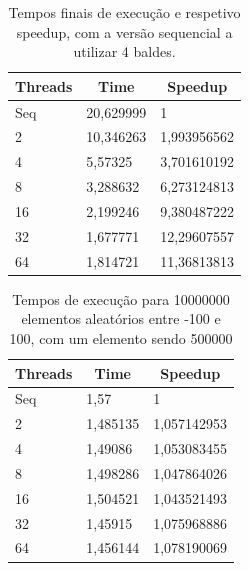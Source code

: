 \documentclass[a4paper]{report}
\begin{document}
\begin{table}[h]
    \centering
    \begin{tabular}{|l|l|l|}
        \hline
        \multicolumn{1}{|c|}{Threads} & \multicolumn{1}{c|}{Time} & \multicolumn{1}{c|}{Speedup} \\ \hline
        Seq                           & 20,629999                 & 1                            \\ \hline
        2                             & 10,346263                 & 1,993956562                  \\ \hline
        4                             & 5,57325                   & 3,701610192                  \\ \hline
        8                             & 3,288632                  & 6,273124813                  \\ \hline
        16                            & 2,199246                  & 9,380487222                  \\ \hline
        32                            & 1,677771                  & 12,29607557                  \\ \hline
        64                            & 1,814721                  & 11,36813813                  \\ \hline
    \end{tabular}
    \caption{\label{tab:final}Tempos finais de execução e respetivo speedup, com a
    versão sequencial a utilizar 4 baldes.}
\end{table}

\begin{table}[h]
    \centering
    \begin{tabular}{|l|l|l|}
        \hline
        \multicolumn{1}{|c|}{Threads} & \multicolumn{1}{c|}{Time} & \multicolumn{1}{c|}{Speedup} \\ \hline
        Seq                           & 1,57                      & 1                            \\ \hline
        2                             & 1,485135                  & 1,057142953                  \\ \hline
        4                             & 1,49086                   & 1,053083455                  \\ \hline
        8                             & 1,498286                  & 1,047864026                  \\ \hline
        16                            & 1,504521                  & 1,043521493                  \\ \hline
        32                            & 1,45915                   & 1,075968886                  \\ \hline
        64                            & 1,456144                  & 1,078190069                  \\ \hline
    \end{tabular}
    \caption{\label{tab:unbal}Tempos de execução para 10000000 elementos aleatórios entre -100 e 100,
    com um elemento sendo 500000}
\end{table}
\end{document}
